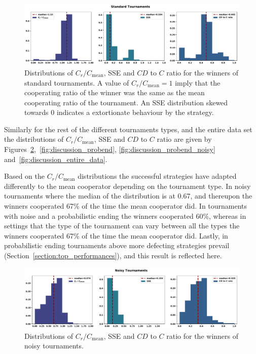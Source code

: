 \documentclass{article}
\begin{document}
\begin{figure}[!htbp]
    \centering
        \centering
        \includegraphics[width=\textwidth]{../images/standard_discussion.pdf}
        \caption{Distributions of \(C_r / C_{\text{mean}}\), SSE and \(CD\) to \(C\) ratio
        for the winners of standard tournaments. A
        value of \(C_r / C_{\text{mean}} = 1\) imply that the cooperating ratio of the
        winner was the same as the mean cooperating ratio of the tournament. An SSE distribution
        skewed towards 0 indicates a extortionate behaviour by the strategy.}
        \label{fig:discussion_standard}
\end{figure}

Similarly for the rest of the different tournaments types, and the entire data
set the distributions of \(C_r / C_{\text{mean}}\), SSE and \(CD\) to \(C\) ratio
are given by Figures~\ref{fig:discussion_noisy},~\ref{fig:discussion_probend},
\ref{fig:discussion_probend_noisy} and~\ref{fig:discussion_entire_data}.

Based on the \(C_r / C_{\text{mean}}\) distributions the successful strategies
have adapted differently to the mean cooperator depending on the tournament
type. In noisy tournaments where the median of the distribution is at 0.67, and
thereupon the winners cooperated 67\% of the time the mean cooperator did. In
tournaments with noise and a probabilistic ending the winners cooperated 60\%,
whereas in settings that the type of the tournament can vary between all the
types the winners cooperated 67\% of the time the mean cooperator did. Lastly,
in probabilistic ending tournaments above more defecting
strategies prevail (Section~\ref{section:top_performances}), and this result is
reflected here.

\begin{figure}[!htbp]
    \centering
        \centering
        \includegraphics[width=\textwidth]{../images/noisy_discussion.pdf}
        \caption{Distributions of \(C_r / C_{\text{mean}}\), SSE and \(CD\) to \(C\) ratio
        for the winners of noisy tournaments.}
        \label{fig:discussion_noisy}
\end{figure}
\end{document}
